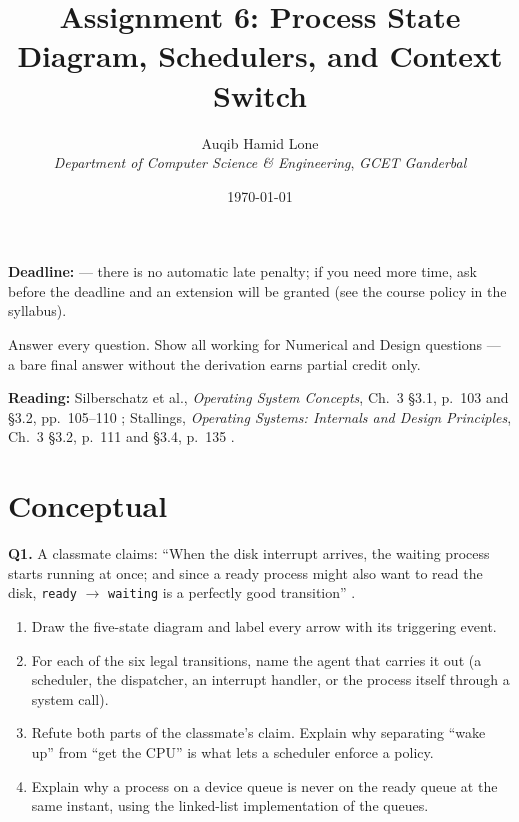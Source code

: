 \documentclass[11pt]{article}
\title{Assignment 6: Process State Diagram, Schedulers, and Context Switch}
\author{Auqib Hamid Lone\\[0.3em]
  \emph{Department of Computer Science \& Engineering}, \emph{GCET Ganderbal}}
\date{\today}
\begin{document}
\maketitle

\noindent\textbf{Deadline:}  --- there is no automatic late penalty; if you need more time, ask before the deadline and an extension will be granted (see the course policy in the syllabus).

\noindent Answer every question. Show all working for Numerical and Design questions --- a bare final answer without the derivation earns partial credit only.

\noindent\textbf{Reading:} Silberschatz et al., \emph{Operating System Concepts}, Ch.~3 \S3.1, p.~103 and \S3.2, pp.~105--110 \cite{SilberschatzOSC_operating_system_concepts}; Stallings, \emph{Operating Systems: Internals and Design Principles}, Ch.~3 \S3.2, p.~111 and \S3.4, p.~135 \cite{StallingsOS_internals_design_principles}.

\section{Conceptual}

\textbf{Q1.} A classmate claims: ``When the disk interrupt arrives, the waiting process starts running at once; and since a ready process might also want to read the disk, \texttt{ready} $\to$ \texttt{waiting} is a perfectly good transition'' \cite{SilberschatzOSC_operating_system_concepts}.
\begin{enumerate}
  \item[(a)] Draw the five-state diagram and label every arrow with its triggering event.
  \item[(b)] For each of the six legal transitions, name the agent that carries it out (a scheduler, the dispatcher, an interrupt handler, or the process itself through a system call).
  \item[(c)] Refute both parts of the classmate's claim. Explain why separating ``wake up'' from ``get the CPU'' is what lets a scheduler enforce a policy.
  \item[(d)] Explain why a process on a device queue is never on the ready queue at the same instant, using the linked-list implementation of the queues.
\end{enumerate}
\end{document}
